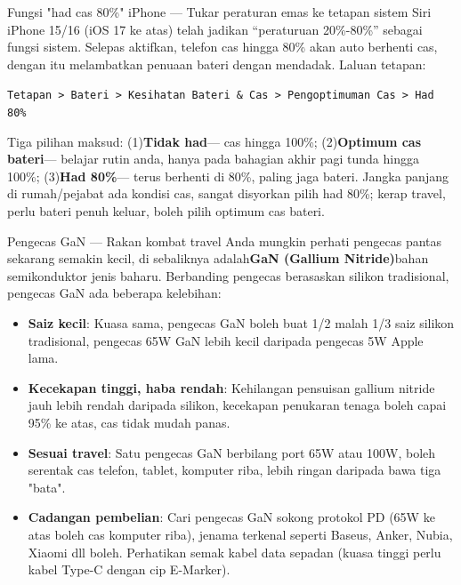 \begin{tcbinfo}{Fungsi "had cas 80\%" iPhone — Tukar peraturan emas ke tetapan sistem}
Siri iPhone 15/16 (iOS 17 ke atas) telah jadikan “peraturuan 20\%-80\%” sebagai fungsi sistem. Selepas aktifkan, telefon cas hingga 80\% akan auto berhenti cas, dengan itu melambatkan penuaan bateri dengan mendadak. Laluan tetapan:

\texttt{Tetapan > Bateri > Kesihatan Bateri \& Cas > Pengoptimuman Cas > Had 80\%}

Tiga pilihan maksud: (1)\textbf{Tidak had}— cas hingga 100\%; (2)\textbf{Optimum cas bateri}— belajar rutin anda, hanya pada bahagian akhir pagi tunda hingga 100\%; (3)\textbf{Had 80\%}— terus berhenti di 80\%, paling jaga bateri. Jangka panjang di rumah/pejabat ada kondisi cas, sangat disyorkan pilih had 80\%; kerap travel, perlu bateri penuh keluar, boleh pilih optimum cas bateri.

\end{tcbinfo}

\begin{tcbinfo}{Pengecas GaN — Rakan kombat travel}
Anda mungkin perhati pengecas pantas sekarang semakin kecil, di sebaliknya adalah\textbf{GaN (Gallium Nitride)}bahan semikonduktor jenis baharu. Berbanding pengecas berasaskan silikon tradisional, pengecas GaN ada beberapa kelebihan:

\begin{itemize}
  \item \textbf{Saiz kecil}: Kuasa sama, pengecas GaN boleh buat 1/2 malah 1/3 saiz silikon tradisional, pengecas 65W GaN lebih kecil daripada pengecas 5W Apple lama.
  \item \textbf{Kecekapan tinggi, haba rendah}: Kehilangan pensuisan gallium nitride jauh lebih rendah daripada silikon, kecekapan penukaran tenaga boleh capai 95\% ke atas, cas tidak mudah panas.
  \item \textbf{Sesuai travel}: Satu pengecas GaN berbilang port 65W atau 100W, boleh serentak cas telefon, tablet, komputer riba, lebih ringan daripada bawa tiga "bata".
  \item \textbf{Cadangan pembelian}: Cari pengecas GaN sokong protokol PD (65W ke atas boleh cas komputer riba), jenama terkenal seperti Baseus, Anker, Nubia, Xiaomi dll boleh. Perhatikan semak kabel data sepadan (kuasa tinggi perlu kabel Type-C dengan cip E-Marker).
\end{itemize}

\end{tcbinfo}

